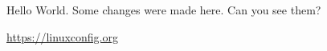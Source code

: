 \documentclass{article}
\begin{document}
Hello World. Some changes were made here. Can you see them?

\url{https://linuxconfig.org}
\end{document}
